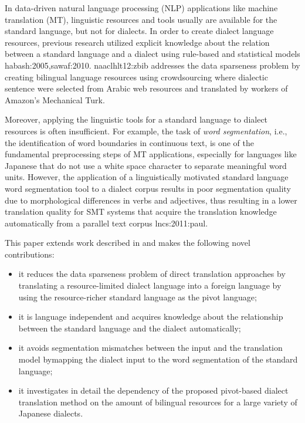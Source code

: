 \documentclass[english]{jnlp_1.4}
\renewcommand{\shortcite}{}
\begin{document}
 In data-driven natural language processing (NLP) applications like machine translation (MT),
 linguistic resources and tools usually are available for the standard language, but not for dialects.
 In order to create dialect language resources, previous research utilized explicit knowledge about the relation
 between a standard language and a dialect using rule-based and statistical models \shortcite{habash:2005,sawaf:2010}.
 \shortcite{naaclhlt12:zbib} addresses the data sparseness problem by creating bilingual language resources using crowdsourcing
 where dialectic sentence were selected from Arabic web resources and translated by workers of Amazon's Mechanical Turk.

 Moreover, applying the linguistic tools for a standard language to dialect
 resources is often insufficient. For example, the task of {\em word segmentation}, i.e., the identification of word boundaries in continuous text,
 is one of the fundamental preprocessing steps of MT applications, especially for languages like Japanese that do not use a white space character
 to separate meaningful word units.
 However, the application of a linguistically motivated standard language word segmentation tool to a dialect corpus results in poor
 segmentation quality due to morphological differences in verbs and adjectives, thus resulting in a lower translation quality for
 SMT systems that acquire the translation knowledge automatically from a parallel text corpus \shortcite{lncs:2011:paul}.
 
     This paper extends work described in \cite{emlp:2011:paul} and makes the following novel contributions: 
 \begin{itemize}
   \item it reduces the data sparseness problem of direct translation approaches by translating
         a resource-limited dialect language into a foreign language by using the resource-richer
         standard language as the pivot language; 
   \item it is language independent and acquires knowledge about the relationship between the standard language
         and the dialect automatically; 
   \item it avoids segmentation mismatches between the input and the translation model by\linebreak mapping
         the dialect input to the word segmentation of the standard language;
   \item it investigates in detail the dependency of the proposed pivot-based dialect translation method
         on the amount of bilingual resources for a large variety of Japanese dialects. 
  \end{itemize}
\end{document}
